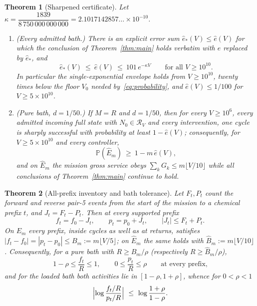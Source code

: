 \documentclass[11pt,a4paper]{article}
\theoremstyle{plain}
\newtheorem{theorem}{Theorem}[section]
\theoremstyle{definition}
\theoremstyle{remark}
\newcommand{\Prob}{\mathbb P}
\newcommand{\cR}{\mathcal R}
\begin{document}
\begin{theorem}[Sharpened certificate]\label{thm:sharp}
Let $\kappa=\dfrac{1839}{8\,750\,000\,000\,000}=2.1017142857\ldots\times10^{-10}$.
\begin{enumerate}[label=(\alph*)]
\item\label{it:sharp-phase} \emph{(Every admitted bath.)} There is an explicit error sum $\widehat e_\ast(V)\le\widehat e(V)$ for which the conclusion of Theorem~\ref{thm:main} holds verbatim with $e$ replaced by $\widehat e_\ast$, and
\begin{equation}\label{eq:sharpenv}
\widehat e_\ast(V)\ \le\ \widehat e(V)\ \le\ 101\,e^{-\kappa V}\qquad\text{for all }V\ge10^{10}.
\end{equation}
In particular the single-exponential envelope holds from $V\ge10^{10}$, twenty times below the floor $V_0$ needed by~\eqref{eq:probability}, and $\widehat e(V)\le1/100$ for $V\ge5\times10^{10}$.
\item\label{it:sharp-service} \emph{(Pure bath, $d=1/50$.)} If $M=R$ and $d=1/50$, then for every $V\ge10^6$, every admitted incoming full state with $N_0\in\cR_V$ and every intervention, one cycle is \emph{sharply} successful with probability at least $1-\widehat e(V)$; consequently, for $V\ge5\times10^{10}$ and every controller,
\begin{equation}\label{eq:sharpprob}
\Prob(\widehat E_m)\ \ge\ 1-m\,\widehat e(V),
\end{equation}
and on $\widehat E_m$ the mission gross service obeys $\sum_kG_k\le m\lfloor V/10\rfloor$ while all conclusions of Theorem~\ref{thm:main} continue to hold.
\end{enumerate}
\end{theorem}

\begin{theorem}[All-prefix inventory and bath tolerance]\label{thm:prefix}
Let $F_t,P_t$ count the forward and reverse pair-5 events from the start of the mission to a chemical prefix $t$, and $J_t=F_t-P_t$. Then at every supported prefix
\begin{equation}\label{eq:inventory}
f_t=f_0-J_t,\qquad p_t=p_0+J_t,\qquad |J_t|\le F_t+P_t .
\end{equation}
On $E_m$ every prefix, inside cycles as well as at returns, satisfies $|f_t-f_0|=|p_t-p_0|\le B_m:=m\lfloor V/5\rfloor$; on $\widehat E_m$ the same holds with $\widehat B_m:=m\lfloor V/10\rfloor$. Consequently, for a pure bath with $R\ge B_m/\rho$ (respectively $R\ge\widehat B_m/\rho$),
\[
1-\rho\le \frac{f_t}R\le1,\qquad 0\le\frac{p_t}R\le\rho\qquad\text{at every prefix,}
\]
and for the loaded bath both activities lie in $[1-\rho,1+\rho]$, whence for $0<\rho<1$
\[
\Bigl|\log\frac{f_t/R}{p_t/R}\Bigr|\ \le\ \log\frac{1+\rho}{1-\rho}.
\]
\end{theorem}
\end{document}

